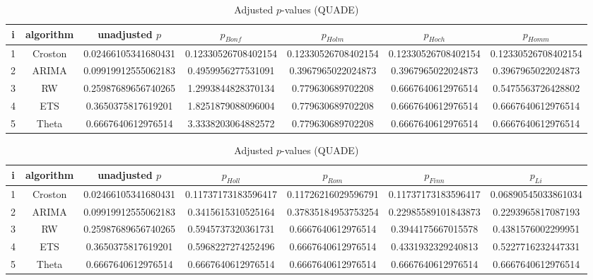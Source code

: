 \documentclass[a4paper,10pt]{article}
\begin{document}
\begin{landscape}
\begin{table}[!htp]
\centering\scriptsize
\caption{Adjusted $p$-values (QUADE)}
\begin{tabular}{ccccccc}
i&algorithm&unadjusted $p$&$p_{Bonf}$&$p_{Holm}$&$p_{Hoch}$&$p_{Homm}$\\
\hline
1&Croston&0.02466105341680431&0.12330526708402154&0.12330526708402154&0.12330526708402154&0.12330526708402154\\
2&ARIMA&0.09919912555062183&0.4959956277531091&0.3967965022024873&0.3967965022024873&0.3967965022024873\\
3&RW&0.25987689656740265&1.2993844828370134&0.779630689702208&0.6667640612976514&0.5475563726428802\\
4&ETS&0.3650375817619201&1.8251879088096004&0.779630689702208&0.6667640612976514&0.6667640612976514\\
5&Theta&0.6667640612976514&3.3338203064882572&0.779630689702208&0.6667640612976514&0.6667640612976514\\
\hline
\end{tabular}
\end{table}

\begin{table}[!htp]
\centering\scriptsize
\caption{Adjusted $p$-values (QUADE)}
\begin{tabular}{ccccccc}
i&algorithm&unadjusted $p$&$p_{Holl}$&$p_{Rom}$&$p_{Finn}$&$p_{Li}$\\
\hline
1&Croston&0.02466105341680431&0.11737173183596417&0.11726216029596791&0.11737173183596417&0.06890545033861034\\
2&ARIMA&0.09919912555062183&0.3415615310525164&0.37835184953753254&0.22985589101843873&0.2293965817087193\\
3&RW&0.25987689656740265&0.5945737320361731&0.6667640612976514&0.3944175667015578&0.4381576002299951\\
4&ETS&0.3650375817619201&0.5968227274252496&0.6667640612976514&0.4331932329240813&0.5227716232447331\\
5&Theta&0.6667640612976514&0.6667640612976514&0.6667640612976514&0.6667640612976514&0.6667640612976514\\
\hline
\end{tabular}
\end{table}

\end{landscape}
\end{document}

